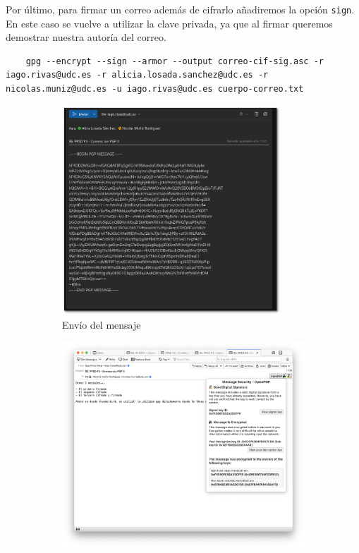 Por último, para firmar un correo además de cifrarlo añadiremos la opción \texttt{sign}. En este caso se vuelve a utilizar la clave privada, ya que al firmar queremos demostrar nuestra autoría del correo.

\begin{verbatim}
    gpg --encrypt --sign --armor --output correo-cif-sig.asc -r iago.rivas@udc.es -r alicia.losada.sanchez@udc.es -r nicolas.muniz@udc.es -u iago.rivas@udc.es cuerpo-correo.txt
\end{verbatim}

\begin{figure}[H]
    \centering
    \begin{subfigure}{.5\textwidth}
        \centering
        \includegraphics[width=0.9\textwidth]{outlook-firmado-cifrado-sombra.png}
        \caption{Envío del mensaje}
    \end{subfigure}%
    \begin{subfigure}{.5\textwidth}
        \centering
        \includegraphics[width=\textwidth]{thunderbird-firmado-cifrado.png}

\end{subfigure}
\end{figure}
